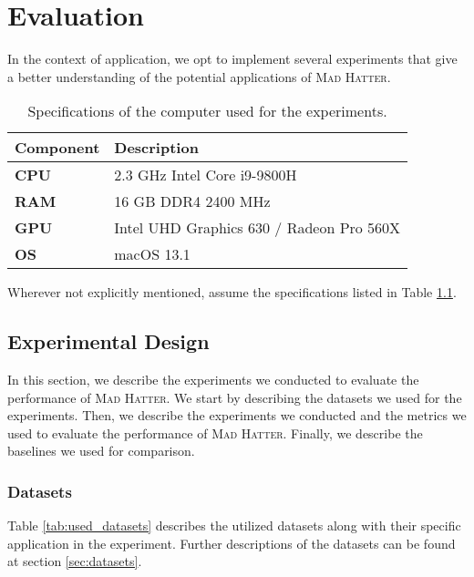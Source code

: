 \chapter{Evaluation}
\label{sec:evaluation}
In the context of application, we opt to implement several experiments that give a better understanding of the potential applications of \textsc{Mad Hatter}. 

\begin{table}[htbp]
    \centering
    \begin{tabular}{lp{}}
        \toprule
        \textbf{Component} & \textbf{Description} \\
        \midrule
        \textbf{CPU} & 2.3 GHz Intel Core i9-9800H \\
        \textbf{RAM} & 16 GB DDR4 2400 MHz \\
        \textbf{GPU} & Intel UHD Graphics 630 / Radeon Pro 560X  \\
        \textbf{OS} & macOS 13.1\\
        \bottomrule
    \end{tabular}
    \caption{Specifications of the computer used for the experiments.}
    \label{tab:specs}
    
    
\end{table}
Wherever not explicitly mentioned, assume the specifications listed in Table \ref{tab:specs}.

\section{Experimental Design}
\label{sec:experimental_design}
In this section, we describe the experiments we conducted to evaluate the performance of \textsc{Mad Hatter}. We start by describing the datasets we used for the experiments. Then, we describe the experiments we conducted and the metrics we used to evaluate the performance of \textsc{Mad Hatter}. Finally, we describe the baselines we used for comparison.

\subsection{Datasets}
\label{sec:datasets_expdesign}
Table \ref{tab:used_datasets} describes the utilized datasets along with their specific application in the experiment. Further descriptions of the datasets can be found at section \ref{sec:datasets}.


